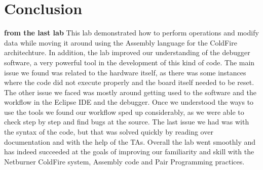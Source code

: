 \documentclass[letterpaper]{article}
\begin{document}

\section{Conclusion}
\textbf{from the last lab}
This lab demonstrated how to perform operations and modify data while
moving it around using the Assembly language for the ColdFire architechture. In
addition, the lab improved our understanding of the debugger software, a very
powerful tool in the development of this kind of code.  The main issue we found
was related to the hardware itself, as there was some instances where the code
did not execute properly and the board itself needed to be reset.  The other
issue we faced was mostly around getting used to the software and the workflow
in the Eclipse IDE and the debugger.  Once we understood the ways to use the
tools we found our workflow sped up considerably, as we were able to check step
by step and find bugs at the source.  The last issue we had was with the syntax
of the code, but that was solved quickly by reading over documentation and with
the help of the TAs.  Overall the lab went smoothly and has indeed succeeded at
the goals of improving our familiarity and skill with the Netburner ColdFire
system, Assembly code and Pair Programming practices.
\end{document}
